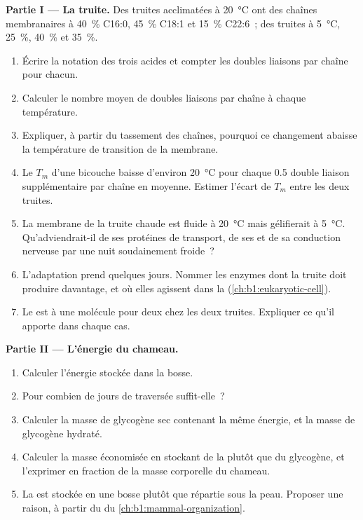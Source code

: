 \begin{problem}
\medskip
\noindent\textbf{Partie I --- La truite.}
Des truites acclimatées à \qty{20}{\celsius} ont des chaînes
membranaires à \qty{40}{\%} C16:0, \qty{45}{\%} C18:1 et \qty{15}{\%}
C22:6~; des truites à \qty{5}{\celsius}, \qty{25}{\%}, \qty{40}{\%} et
\qty{35}{\%}.
\begin{enumerate}
  \item Écrire la notation des trois acides et compter les doubles
        liaisons par chaîne pour chacun.
  \item Calculer le nombre moyen de doubles liaisons par chaîne à
        chaque température.
  \item Expliquer, à partir du tassement des chaînes, pourquoi ce
        changement abaisse la température de transition de la membrane.
  \item Le $T_m$ d'une bicouche baisse d'environ \qty{20}{\celsius}
        pour chaque \qty{0.5}{} double liaison supplémentaire par chaîne
        en moyenne. Estimer l'écart de $T_m$ entre les deux truites.
  \item La membrane de la truite chaude est fluide à \qty{20}{\celsius}
        mais gélifierait à \qty{5}{\celsius}. Qu'adviendrait-il de ses
        protéines de transport, de ses  et de sa conduction
        nerveuse par une nuit soudainement froide~?
  \item L'adaptation prend quelques jours. Nommer les enzymes dont la
        truite doit produire davantage, et où elles agissent dans la
         (\cref{ch:b1:eukaryotic-cell}).
  \item Le  est à une molécule pour deux  chez
        les deux truites. Expliquer ce qu'il apporte dans chaque cas.
\end{enumerate}

\medskip
\noindent\textbf{Partie II --- L'énergie du chameau.}
\begin{enumerate}[resume]
  \item Calculer l'énergie stockée dans la bosse.
  \item Pour combien de jours de traversée suffit-elle~?
  \item Calculer la masse de glycogène sec contenant la même énergie, et
        la masse de glycogène hydraté.
  \item Calculer la masse économisée en stockant de la  plutôt
        que du glycogène, et l'exprimer en fraction de la masse
        corporelle du chameau.
  \item La  est stockée en une bosse plutôt que répartie sous la
        peau. Proposer une raison, à partir du  du
        \cref{ch:b1:mammal-organization}.
\end{enumerate}


\end{problem}
